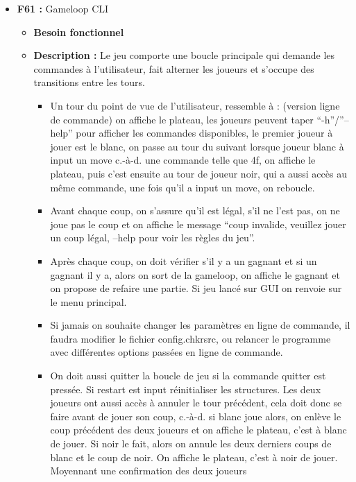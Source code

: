 \documentclass{article}
\begin{document}
\begin{itemize}
\begin{itemize}
        \item \textbf{Tests :} Vérifier que le programme se termine et renvoie 0 si on entre ‘quit’ puis ‘y’ et vérifier que le programme continue en jouant quelques coups si on entre ‘q’ et ‘n’.
    \end{itemize}
\bigskip
    \item \textbf{F61 :} Gameloop CLI
    \begin{itemize}
        \item \textbf{Besoin fonctionnel}
        \item \textbf{Description :} Le jeu comporte une boucle principale qui demande les commandes à l’utilisateur, fait alterner les joueurs et s’occupe des transitions entre les tours.
        \begin{itemize}
        	\item Un tour du point de vue de l’utilisateur, ressemble à : (version ligne de commande) on affiche le plateau, les joueurs peuvent taper “-h”/”--help” pour afficher les commandes disponibles, le premier joueur à jouer est le blanc, on passe au tour du suivant lorsque joueur blanc à input un move c.-à-d. une commande telle que 4f, on affiche le plateau, puis c’est ensuite au tour de joueur noir, qui a aussi accès au même commande, une fois qu’il a input un move, on reboucle.
        	\item Avant chaque coup, on s’assure qu’il est légal, s’il ne l’est pas, on ne joue pas le coup et on affiche le message “coup invalide, veuillez jouer un coup légal, –help pour voir les règles du jeu”. 
        	\item Après chaque coup, on doit vérifier s'il y a un gagnant et si un gagnant il y a, alors on sort de la gameloop, on affiche le gagnant et on propose de refaire une partie. Si jeu lancé sur GUI on renvoie sur le menu principal.
        	\item Si jamais on souhaite changer les paramètres en ligne de commande, il faudra modifier le fichier config.chkrsrc, ou relancer le programme avec différentes options passées en ligne de commande.
            \item On doit aussi quitter la boucle de jeu si la commande quitter est pressée.
            Si restart est input réinitialiser les structures.
            Les deux joueurs ont aussi accès à annuler le tour précédent, cela doit donc se faire avant de jouer son coup, c.-à-d. si blanc joue alors, on enlève le coup précédent des deux joueurs et on affiche le plateau, c'est à blanc de jouer. Si noir le fait, alors on annule les deux derniers coups de blanc et le coup de noir. On affiche le plateau, c'est à noir de jouer. Moyennant une confirmation des deux joueurs

\end{itemize}
\end{itemize}
\end{itemize}
\end{document}
